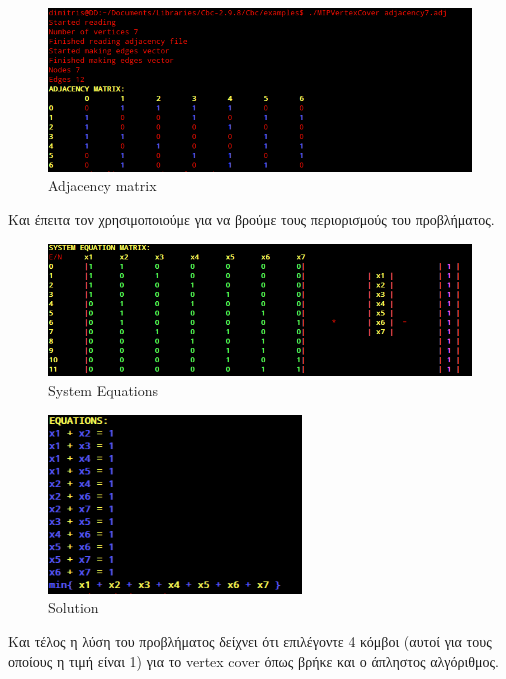 \begin{figure}[H]
\caption{Adjacency matrix}
\centering
\includegraphics[width=1.1\textwidth]{Figures/adjac.png}\centering
\end{figure}

Και έπειτα τον χρησιμοποιούμε για να βρούμε τους περιορισμούς του προβλήματος.


\begin{figure}[H]
\caption{System Equations}
\centering
\includegraphics[width=1.1\textwidth]{Figures/sys.png}\centering
\end{figure}


\begin{figure}[H]
\caption{Solution}
\centering
\includegraphics[width=0.6\textwidth]{Figures/const.png}\centering
\end{figure}

Και τέλος η λύση του προβλήματος δείχνει ότι επιλέγοντε 4 κόμβοι (αυτοί για τους οποίους η τιμή είναι 1) για το vertex cover όπως βρήκε και ο άπληστος αλγόριθμος.

